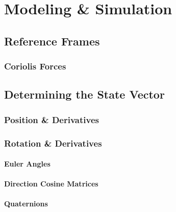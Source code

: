 \documentclass[../notes.tex]{subfiles}
\begin{document}
\section{Modeling \& Simulation}
\subsection{Reference Frames}
\subsubsection{Coriolis Forces} \label{sec:coriolis}

\subsection{Determining the State Vector}
\subsubsection{Position \& Derivatives}
\subsubsection{Rotation \& Derivatives}
\paragraph{Euler Angles}
\paragraph{Direction Cosine Matrices}
\paragraph{Quaternions}
\end{document}
